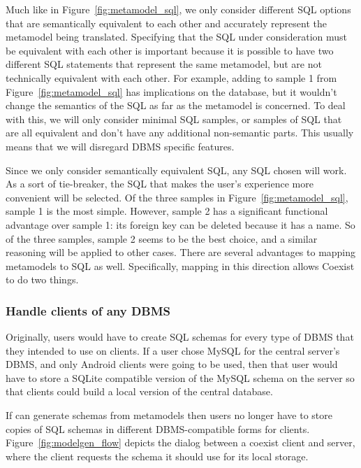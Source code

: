 Much like in Figure~\ref{fig:metamodel_sql}, we only consider different SQL
options that are semantically equivalent to each other and accurately represent
the metamodel being translated. Specifying that the SQL under consideration must
be equivalent with each other is important because it is possible to have two
different SQL statements that represent the same metamodel, but are not
technically equivalent with each other. For example, adding 
to sample 1 from Figure~\ref{fig:metamodel_sql} has implications on the
database, but it wouldn't change the semantics of the SQL as far as the
metamodel is concerned. To deal with this, we will only consider minimal SQL
samples, or samples of SQL that are all equivalent and don't have any additional
non-semantic parts. This usually means that we will disregard DBMS specific
features.

Since we only consider semantically equivalent SQL, any SQL chosen will work.
As a sort of tie-breaker, the SQL that makes the user's experience more
convenient will be selected. Of the three samples in Figure~\ref{fig:metamodel_sql},
sample 1 is the most simple. However, sample 2 has a significant functional advantage
over sample 1: its foreign key can be deleted because it has a name. So of the
three samples, sample 2 seems to be the best choice, and a similar reasoning
will be applied to other cases. There are several advantages to mapping
metamodels to SQL as well. Specifically, mapping in this direction allows
Coexist to do two things.


\setcounter{subsubsection}{0}
\subsubsection{Handle clients of any DBMS} \label{sec:mm_advantage}

Originally, users would have to create SQL schemas for every type of DBMS that
they intended to use on clients. If a user chose MySQL for the central server's
DBMS, and only Android clients were going to be used, then that user would have
to store a SQLite compatible version of the MySQL schema on the server so that
clients could build a local version of the central database.

If  can generate schemas from metamodels then users no longer have to
store copies of SQL schemas in different DBMS-compatible forms for
clients. Figure~\ref{fig:modelgen_flow} depicts the dialog between a coexist
client and server, where the client requests the schema it should use for its
local storage.


